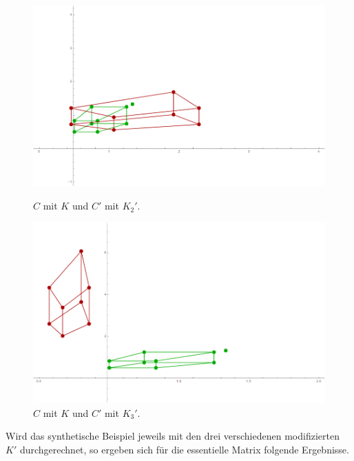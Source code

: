 \begin{figure}[!htb]
	\includegraphics[width=\linewidth]{images/Zeta32_12.png}
	\caption[Abbildungen mit $K'_2$ und $K$]{$C$ mit $K$ und $C'$ mit $K_2'$.}
	\label{fig:K2}
	\endminipage\hfill
	\includegraphics[width=\linewidth]{images/Zeta05_43.png}
	\caption[Abbildungen mit $K'_3$ und $K$]{$C$ mit $K$ und $C'$ mit $K_3'$.}
	\label{fig:K3}
	\endminipage\hfill
\end{figure}
\pagebreak

Wird das synthetische Beispiel jeweils mit den drei verschiedenen modifizierten $K'$ durchgerechnet, so ergeben sich für die essentielle Matrix folgende Ergebnisse.\\

